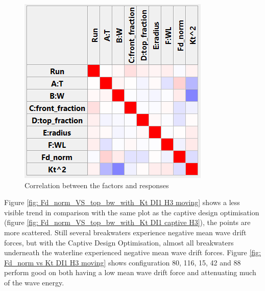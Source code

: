 \begin{figure}[h]
    \centering
    \includegraphics[width=0.3\linewidth]{figures/ComFLOW/Results moving/DI1/H3/correlation_H3.png}
    \caption{Correlation between the factors and responses}
    \label{fig: correlation R1 DI1 moving H3}
\end{figure}


Figure \ref{fig: Fd_norm_VS_top_bw_with_Kt DI1 H3 moving} shows a less visible trend in comparison with the same plot as the captive design optimisation (figure \ref{fig: Fd_norm_VS_top_bw_with_Kt DI1 captive H3}), the points are more scattered. Still several breakwaters experience negative mean wave drift forces, but with the Captive Design Optimisation, almost all breakwaters underneath the waterline experienced negative mean wave drift forces. Figure \ref{fig:  Fd_norm vs Kt DI1 H3 moving} shows configuration 80, 116, 15, 42 and 88 perform good on both having a low mean wave drift force and attenuating much of the wave energy.


